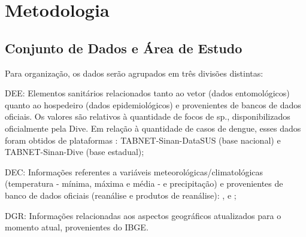 \chapter{Metodologia}

\section{Conjunto de Dados e Área de Estudo}

Para organização, os dados serão agrupados em três divisões distintas: 

\begin{alineas}
    \item \acrfull{DEE}: Elementos sanitários relacionados tanto ao vetor (dados entomológicos) quanto ao hospedeiro (dados epidemiológicos) e provenientes de bancos de dados oficiais. Os valores são relativos à quantidade de focos de  sp., disponibilizados oficialmente pela \acrshort{Dive}. Em relação à quantidade de casos de dengue, esses dados foram obtidos de plataformas : TABNET-\acrshort{Sinan}-\acrshort{DataSUS} (base nacional) e TABNET-\acrshort{Sinan}-\acrshort{Dive} (base estadual); 
    
    \item \acrfull{DEC}: Informações referentes a variáveis meteorológicas/climatológicas (temperatura - mínima, máxima e média - e precipitação) e provenientes de banco de dados oficiais (reanálise e produtos de reanálise):  ,  e ;

    \item \acrfull{DGR}: Informações relacionadas aos aspectos geográficos atualizados para o momento atual, provenientes do \acrshort{IBGE}. 
\end{alineas}

